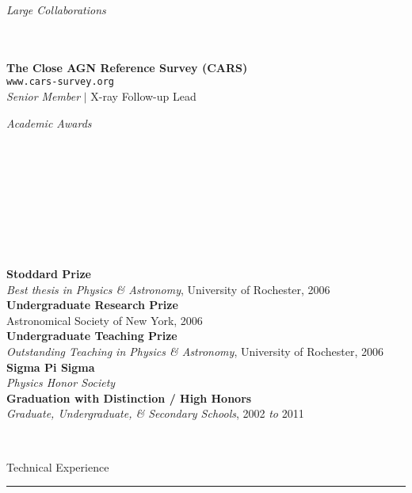 \documentclass[11pt]{article}
\makeatletter
\def\vhrulefill#1{\leavevmode\leaders\hrule\@height#1\hfill \kern\z@}
\makeatother
\begin{document}
\vspace{6mm}

\hspace{2.5mm} \parbox{1.5in}{{\it Large Collaborations \\\\\\}} \parbox{5.15in}{{\bf The Close AGN Reference Survey (CARS)} \\ \texttt{www.cars-survey.org} \\ {\it Senior Member} $|$ X-ray Follow-up Lead \\
} 

\hspace{2.5mm} \parbox{1.5in}{{\it Academic Awards \\\\\\\\\\\\\\\\\\}} \parbox{5.15in}{
{\bf Stoddard Prize} \\ {\it Best thesis in Physics \& Astronomy}, University of Rochester, 2006 \\
{\bf Undergraduate Research Prize} \\ Astronomical Society of New York, 2006 \\
{\bf Undergraduate Teaching Prize} \\ {\it Outstanding Teaching in Physics \& Astronomy}, University of Rochester, 2006\\
{\bf Sigma Pi Sigma} \\ {\it Physics Honor Society} \\
{\bf Graduation with Distinction / High Honors} \\ {\it Graduate, Undergraduate, \& Secondary Schools}, 2002 {\it to} 2011
} \\


\vspace{2mm}



{\sc Technical Experience} \vhrulefill{0.4pt}

\vspace{5mm}
\end{document}
